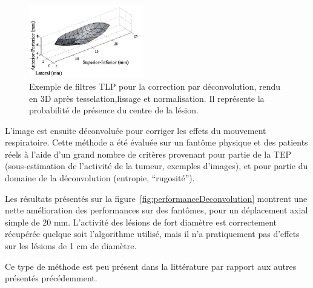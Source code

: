 \begin{figure}[h!]
	\begin{center}
		\includegraphics[width=5cm]{images/formeTLP}
	\end{center}
	\caption[Exemple de filtres TLP pour la correction par déconvolution]{Exemple de filtres TLP pour la correction par déconvolution, rendu en 3D après tesselation,lissage et normalisation. Il représente la probabilité de présence du centre de la lésion.} 
	\label{fig:formeTLP}
\end{figure}



L'image est ensuite déconvoluée pour corriger les effets du mouvement respiratoire. Cette méthode a été évaluée sur un fantôme physique et des patients réels à l'aide d'un grand nombre de critères provenant pour partie de la TEP (sous-estimation de l'activité de la tumeur, exemples d'images), et pour partie du domaine de la déconvolution (entropie, ``rugosité'').

Les résultats présentés sur la figure~\ref{fig:performanceDeconvolution} montrent une nette amélioration des performances sur des fantômes, pour un déplacement axial simple de 20 mm. L'activité des lésions de fort diamètre est correctement récupérée quelque soit l'algorithme utilisé, mais il n'a pratiquement pas d'effets sur les lésions de 1 cm de diamètre.

Ce type de méthode est peu présent dans la littérature par rapport aux autres présentés précédemment. 

